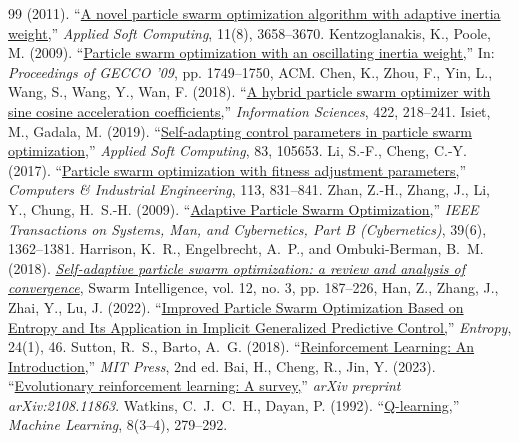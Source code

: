 \documentclass[final,5p,times]{elsarticle}
\begin{document}
\begin{table}[t]
{\begin{thebibliography}{99}
(2011).
``\href{https://doi.org/10.1016/j.asoc.2011.01.037}{A novel particle swarm optimization algorithm with adaptive inertia weight,}''
\textit{Applied Soft Computing}, 11(8), 3658--3670. 
Kentzoglanakis, K., Poole, M.
(2009).
``\href{https://doi.org/10.1145/1569901.1570140}{Particle swarm optimization with an oscillating inertia weight,}''
In: \emph{Proceedings of GECCO '09}, pp. 1749--1750, ACM. 
Chen, K., Zhou, F., Yin, L., Wang, S., Wang, Y., Wan, F.
(2018).
``\href{https://doi.org/10.1016/j.ins.2017.09.015}{A hybrid particle swarm optimizer with sine cosine acceleration coefficients,}''
\textit{Information Sciences}, 422, 218--241. 
Isiet, M., Gadala, M.
(2019).
``\href{https://doi.org/10.1016/j.asoc.2019.105653}{Self-adapting control parameters in particle swarm optimization,}''
\textit{Applied Soft Computing}, 83, 105653. 
Li, S.-F., Cheng, C.-Y.
(2017).
``\href{https://doi.org/10.1016/j.cie.2017.06.006}{Particle swarm optimization with fitness adjustment parameters,}''
\textit{Computers \& Industrial Engineering}, 113, 831--841. 
Zhan, Z.-H., Zhang, J., Li, Y., Chung, H.~S.-H.
(2009).
``\href{https://doi.org/10.1109/tsmcb.2009.2015956}{Adaptive Particle Swarm Optimization,}''
\textit{IEEE Transactions on Systems, Man, and Cybernetics, Part B (Cybernetics)}, 39(6), 1362--1381. 
Harrison, K.~R., Engelbrecht, A.~P., and Ombuki-Berman, B.~M.
(2018).
\href{https://doi.org/10.1007/s11721-017-0150-9}{\emph{Self-adaptive particle swarm optimization: a review and analysis of convergence}},
Swarm Intelligence,
vol. 12, no. 3, pp. 187--226, 
Han, Z., Zhang, J., Zhai, Y., Lu, J.
(2022).
``\href{https://doi.org/10.3390/e24010048}{Improved Particle Swarm Optimization Based on Entropy and Its Application in Implicit Generalized Predictive Control,}''
\textit{Entropy}, 24(1), 46. 
Sutton, R.~S., Barto, A.~G.
(2018).
``\href{http://incompleteideas.net/book/the-book-2nd.html}{Reinforcement Learning: An Introduction,}''
\textit{MIT Press}, 2nd ed. 
Bai, H., Cheng, R., Jin, Y.
(2023).
``\href{https://arxiv.org/abs/2108.11863}{Evolutionary reinforcement learning: A survey,}''
\textit{arXiv preprint arXiv:2108.11863}. 
Watkins, C.~J.~C.~H., Dayan, P.
(1992).
``\href{https://doi.org/10.1007/bf00992698}{Q-learning,}''
\textit{Machine Learning}, 8(3--4), 279--292. 

\end{thebibliography}}
\end{table}
\end{document}
